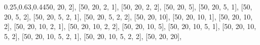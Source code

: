 \documentclass[
  paper=a4,
  ,captions=tableheading
]{scrartcl}
\newenvironment{Shaded}{}{}
\newcommand{\DecValTok}[1]{\textcolor[rgb]{0.25,0.63,0.44}{#1}}
\newcommand{\NormalTok}[1]{#1}
\begin{document}
\begin{Shaded}
\begin{Highlighting}[]
\NormalTok{    [}\DecValTok{50}\NormalTok{, }\DecValTok{20}\NormalTok{, }\DecValTok{2}\NormalTok{],}
\NormalTok{    [}\DecValTok{50}\NormalTok{, }\DecValTok{20}\NormalTok{, }\DecValTok{2}\NormalTok{, }\DecValTok{1}\NormalTok{],}
\NormalTok{    [}\DecValTok{50}\NormalTok{, }\DecValTok{20}\NormalTok{, }\DecValTok{2}\NormalTok{, }\DecValTok{2}\NormalTok{],}
\NormalTok{    [}\DecValTok{50}\NormalTok{, }\DecValTok{20}\NormalTok{, }\DecValTok{5}\NormalTok{],}
\NormalTok{    [}\DecValTok{50}\NormalTok{, }\DecValTok{20}\NormalTok{, }\DecValTok{5}\NormalTok{, }\DecValTok{1}\NormalTok{],}
\NormalTok{    [}\DecValTok{50}\NormalTok{, }\DecValTok{20}\NormalTok{, }\DecValTok{5}\NormalTok{, }\DecValTok{2}\NormalTok{],}
\NormalTok{    [}\DecValTok{50}\NormalTok{, }\DecValTok{20}\NormalTok{, }\DecValTok{5}\NormalTok{, }\DecValTok{2}\NormalTok{, }\DecValTok{1}\NormalTok{],}
\NormalTok{    [}\DecValTok{50}\NormalTok{, }\DecValTok{20}\NormalTok{, }\DecValTok{5}\NormalTok{, }\DecValTok{2}\NormalTok{, }\DecValTok{2}\NormalTok{],}
\NormalTok{    [}\DecValTok{50}\NormalTok{, }\DecValTok{20}\NormalTok{, }\DecValTok{10}\NormalTok{],}
\NormalTok{    [}\DecValTok{50}\NormalTok{, }\DecValTok{20}\NormalTok{, }\DecValTok{10}\NormalTok{, }\DecValTok{1}\NormalTok{],}
\NormalTok{    [}\DecValTok{50}\NormalTok{, }\DecValTok{20}\NormalTok{, }\DecValTok{10}\NormalTok{, }\DecValTok{2}\NormalTok{],}
\NormalTok{    [}\DecValTok{50}\NormalTok{, }\DecValTok{20}\NormalTok{, }\DecValTok{10}\NormalTok{, }\DecValTok{2}\NormalTok{, }\DecValTok{1}\NormalTok{],}
\NormalTok{    [}\DecValTok{50}\NormalTok{, }\DecValTok{20}\NormalTok{, }\DecValTok{10}\NormalTok{, }\DecValTok{2}\NormalTok{, }\DecValTok{2}\NormalTok{],}
\NormalTok{    [}\DecValTok{50}\NormalTok{, }\DecValTok{20}\NormalTok{, }\DecValTok{10}\NormalTok{, }\DecValTok{5}\NormalTok{],}
\NormalTok{    [}\DecValTok{50}\NormalTok{, }\DecValTok{20}\NormalTok{, }\DecValTok{10}\NormalTok{, }\DecValTok{5}\NormalTok{, }\DecValTok{1}\NormalTok{],}
\NormalTok{    [}\DecValTok{50}\NormalTok{, }\DecValTok{20}\NormalTok{, }\DecValTok{10}\NormalTok{, }\DecValTok{5}\NormalTok{, }\DecValTok{2}\NormalTok{],}
\NormalTok{    [}\DecValTok{50}\NormalTok{, }\DecValTok{20}\NormalTok{, }\DecValTok{10}\NormalTok{, }\DecValTok{5}\NormalTok{, }\DecValTok{2}\NormalTok{, }\DecValTok{1}\NormalTok{],}
\NormalTok{    [}\DecValTok{50}\NormalTok{, }\DecValTok{20}\NormalTok{, }\DecValTok{10}\NormalTok{, }\DecValTok{5}\NormalTok{, }\DecValTok{2}\NormalTok{, }\DecValTok{2}\NormalTok{],}
\NormalTok{    [}\DecValTok{50}\NormalTok{, }\DecValTok{20}\NormalTok{, }\DecValTok{20}\NormalTok{],}

\end{Highlighting}
\end{Shaded}
\end{document}

